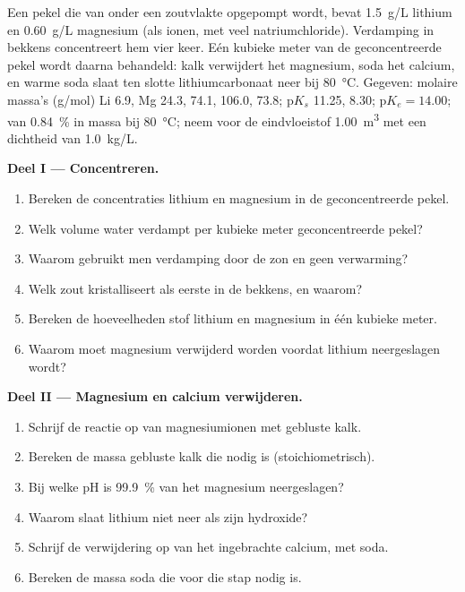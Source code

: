 \begin{problem}
\label{pb:b1:s-block:1}
Een pekel die van onder een zoutvlakte opgepompt wordt, bevat
\qty{1.5}{g/L} lithium en \qty{0.60}{g/L} magnesium (als ionen, met veel
natriumchloride). Verdamping in bekkens concentreert hem vier keer. Eén
kubieke meter van de geconcentreerde pekel wordt daarna behandeld: kalk
verwijdert het magnesium, soda het calcium, en warme soda slaat ten
slotte lithiumcarbonaat neer bij \qty{80}{\celsius}. Gegeven: molaire
massa's (\unit{g/mol}) Li 6.9, Mg 24.3,  74.1, 
106.0,  73.8; $\mathrm{p}K_s$  11.25, 
8.30; $\mathrm{p}K_e = 14.00$;  van 
\qty{0.84}{\percent} in massa bij \qty{80}{\celsius}; neem voor de
eindvloeistof \qty{1.00}{m^3} met een dichtheid van \qty{1.0}{kg/L}.

\medskip
\noindent\textbf{Deel I --- Concentreren.}
\begin{enumerate}
  \item Bereken de concentraties lithium en magnesium in de
        geconcentreerde pekel.
  \item Welk volume water verdampt per kubieke meter geconcentreerde
        pekel?
  \item Waarom gebruikt men verdamping door de zon en geen verwarming?
  \item Welk zout kristalliseert als eerste in de bekkens, en waarom?
  \item Bereken de hoeveelheden stof lithium en magnesium in één kubieke
        meter.
  \item Waarom moet magnesium verwijderd worden voordat lithium
        neergeslagen wordt?
\end{enumerate}

\medskip
\noindent\textbf{Deel II --- Magnesium en calcium verwijderen.}
\begin{enumerate}[resume]
  \item Schrijf de reactie op van magnesiumionen met gebluste kalk.
  \item Bereken de massa gebluste kalk die nodig is (stoichiometrisch).
  \item Bij welke pH is \qty{99.9}{\percent} van het magnesium
        neergeslagen?
  \item Waarom slaat lithium niet neer als zijn hydroxide?
  \item Schrijf de verwijdering op van het ingebrachte calcium, met soda.
  \item Bereken de massa soda die voor die stap nodig is.
\end{enumerate}


\end{problem}
